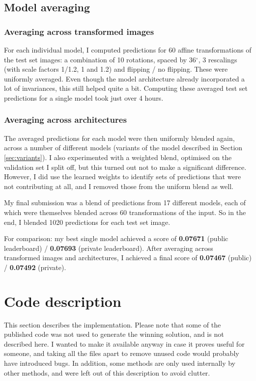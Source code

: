 \documentclass[a4paper,10pt]{article}
\begin{document}
\subsection{Model averaging}
\label{sec:model-averaging}

\subsubsection{Averaging across transformed images}

For each individual model, I computed predictions for 60 affine transformations of the test set images: a combination of 10 rotations, spaced by 36$^\circ$, 3 rescalings (with scale factors 1/1.2, 1 and 1.2) and flipping / no flipping. These were uniformly averaged. Even though the model architecture already incorporated a lot of invariances, this still helped quite a bit. Computing these averaged test set predictions for a single model took just over 4 hours.

\subsubsection{Averaging across architectures}

The averaged predictions for each model were then uniformly blended again, across a number of different models (variants of the model described in Section \ref{sec:variants}). I also experimented with a weighted blend, optimised on the validation set I split off, but this turned out not to make a significant difference. However, I did use the learned weights to identify sets of predictions that were not contributing at all, and I removed those from the uniform blend as well.

My final submission was a blend of predictions from 17 different models, each of which were themselves blended across 60 transformations of the input. So in the end, I blended 1020 predictions for each test set image.

For comparison: my best single model achieved a score of \textbf{0.07671} (public leaderboard) / \textbf{0.07693} (private leaderboard). After averaging across transformed images and architectures, I achieved a final score of \textbf{0.07467} (public) / \textbf{0.07492} (private).


\section{Code description}

This section describes the implementation. Please note that some of the published code was not used to generate the winning solution, and is not described here. I wanted to make it available anyway in case it proves useful for someone, and taking all the files apart to remove unused code would probably have introduced bugs. In addition, some methods are only used internally by other methods, and were left out of this description to avoid clutter.
\end{document}
